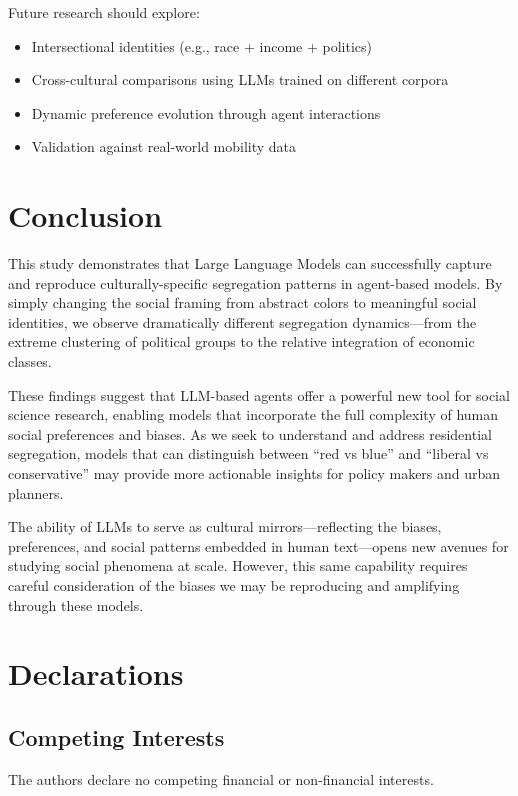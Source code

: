 \documentclass[pdflatex,sn-basic]{sn-jnl}%
\begin{document}
Future research should explore: 
\begin{itemize}
\item Intersectional identities (e.g., race
+ income + politics) 
\item Cross-cultural comparisons using LLMs trained on
different corpora 
\item Dynamic preference evolution through agent
interactions 
\item Validation against real-world mobility data
\end{itemize}

\section{Conclusion}\label{conclusion}

This study demonstrates that Large Language Models can successfully
capture and reproduce culturally-specific segregation patterns in
agent-based models. By simply changing the social framing from abstract
colors to meaningful social identities, we observe dramatically
different segregation dynamics---from the extreme clustering of
political groups to the relative integration of economic classes.

These findings suggest that LLM-based agents offer a powerful new tool
for social science research, enabling models that incorporate the full
complexity of human social preferences and biases. As we seek to
understand and address residential segregation, models that can
distinguish between ``red vs blue'' and ``liberal vs conservative'' may
provide more actionable insights for policy makers and urban planners.

The ability of LLMs to serve as cultural mirrors---reflecting the
biases, preferences, and social patterns embedded in human text---opens
new avenues for studying social phenomena at scale. However, this same
capability requires careful consideration of the biases we may be
reproducing and amplifying through these models.

\section*{Declarations}

\subsection*{Competing Interests}
The authors declare no competing financial or non-financial interests.
\end{document}
